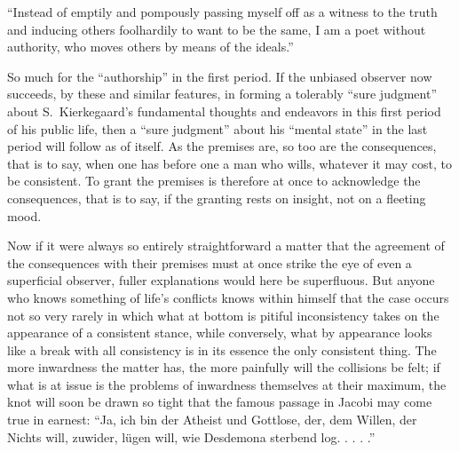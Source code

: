 \documentclass[12pt,a4paper]{article}
\newcommand{\opage}[1]{\marginnote{\footnotesize\textit{[#1]}}}
\begin{document}
``Instead of emptily and pompously passing myself off as a witness to
the truth and inducing others foolhardily to want to be the same, I am a
poet without authority, who moves others by means of the ideals.''

So much for the ``authorship'' in the first period. If the unbiased
observer now succeeds, by these
\opage{16}and similar features, in forming a tolerably ``sure judgment''
about S.\ Kierkegaard's fundamental thoughts and endeavors in this first
period of his public life, then a ``sure judgment'' about his ``mental
state'' in the last period will follow as of itself. As the premises
are, so too are the consequences, that is to say, when one has before
one a man who wills, whatever it may cost, to be consistent. To grant
the premises is therefore at once to acknowledge the consequences, that
is to say, if the granting rests on insight, not on a fleeting mood.

Now if it were always so entirely straightforward a matter that the
agreement of the consequences with their premises must at once strike
the eye of even a superficial observer, fuller explanations would here
be superfluous. But anyone who knows something of life's conflicts
knows within himself that the case occurs not so very rarely in which
what at bottom is pitiful inconsistency takes on the appearance of a
consistent stance, while conversely, what by appearance looks like a
break with all consistency is in its essence the only consistent thing.
The more inwardness the matter has, the more painfully will the
collisions be felt; if what is at issue is the problems of inwardness
themselves at their maximum, the knot will soon be drawn so tight that
the famous passage in Jacobi may come true in earnest: ``Ja, ich
bin der Atheist und Gottlose, der, dem Willen, der Nichts will, zuwider,
lügen will, wie Desdemona sterbend log. . . . .''
\end{document}
